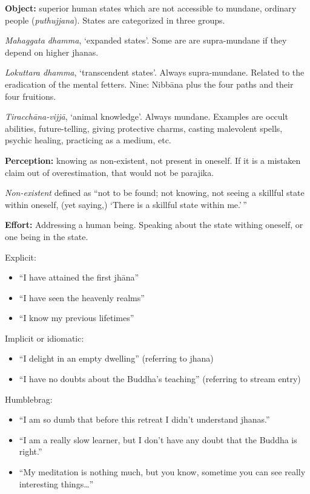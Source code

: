 \textbf{Object:} superior human states which are not accessible to
mundane, ordinary people (\emph{puthujjana}). States are categorized in
three groups.

\emph{Mahaggata dhamma}, `expanded states'. Some are are supra-mundane
if they depend on higher jhanas.

\emph{Lokuttara dhamma}, `transcendent states'. Always supra-mundane.
Related to the eradication of the mental fetters. Nine: Nibbāna plus the
four paths and their four fruitions.

\emph{Tiracchāna-vijjā}, `animal knowledge'. Always mundane. Examples
are occult abilities, future-telling, giving protective charms, casting
malevolent spells, psychic healing, practicing as a medium, etc.

\textbf{Perception:} knowing as non-existent, not present in oneself. If
it is a mistaken claim out of overestimation, that would not be
parajika.

\emph{Non-existent} defined as ``not to be found; not knowing, not
seeing a skillful state within oneself, (yet saying,) `There is a
skillful state within me.'\,''

\textbf{Effort:} Addressing a human being. Speaking about the state
withing oneself, or one being in the state.

Explicit:

\begin{itemize}
\tightlist
\item
  ``I have attained the first jhāna''
\item
  ``I have seen the heavenly realms''
\item
  ``I know my previous lifetimes''
\end{itemize}

Implicit or idiomatic:

\begin{itemize}
\tightlist
\item
  ``I delight in an empty dwelling'' (referring to jhana)
\item
  ``I have no doubts about the Buddha's teaching'' (referring to stream
  entry)
\end{itemize}

Humblebrag:

\begin{itemize}
\tightlist
\item
  ``I am so dumb that before this retreat I didn't understand jhanas.''
\item
  ``I am a really slow learner, but I don't have any doubt that the
  Buddha is right.''
\item
  ``My meditation is nothing much, but you know, sometime you can see
  really interesting things\ldots{}''
\end{itemize}

